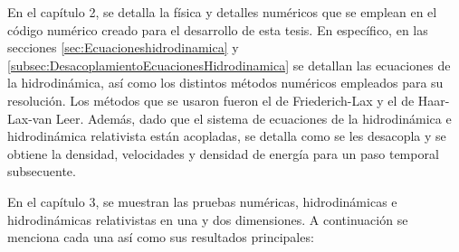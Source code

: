 \documentclass[12pt,a4paper]{book}
\begin{document}
En el capítulo 2, se detalla la física y detalles numéricos que se emplean en el código numérico creado para el desarrollo de esta tesis. En específico, en las secciones \ref{sec:Ecuacioneshidrodinamica} y 
\ref{subsec:DesacoplamientoEcuacionesHidrodinamica} se detallan las ecuaciones de la hidrodinámica, así como los distintos métodos numéricos empleados para su resolución. Los métodos que se usaron fueron el 
de Friederich-Lax y el de Haar-Lax-van Leer. Además, dado que el sistema de ecuaciones de la hidrodinámica e hidrodinámica relativista están acopladas, se detalla como se les desacopla y se obtiene la densidad, 
velocidades y densidad de energía para un paso temporal subsecuente.

En el capítulo 3, se muestran las pruebas numéricas, hidrodinámicas e hidrodinámicas relativistas en una y dos dimensiones. A continuación se menciona cada una así como sus resultados principales: 
\end{document}
